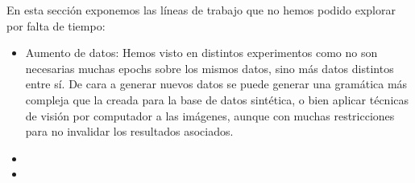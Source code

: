 \documentclass[a4paper, 20pt, dvipsnames]{article}
\begin{document}
En esta sección exponemos las líneas de trabajo que no hemos podido explorar por falta de tiempo:

\begin{itemize}
	\item Aumento de datos: Hemos visto en distintos experimentos como no son necesarias muchas epochs sobre los mismos datos, sino más datos distintos entre sí. De cara a generar nuevos datos se puede generar una gramática más compleja que la creada para la base de datos sintética, o bien aplicar técnicas de visión por computador a las imágenes, aunque con muchas restricciones para no invalidar los resultados asociados.
	\item %
	\item  %
\end{itemize}







\printbibliography
\end{document}

